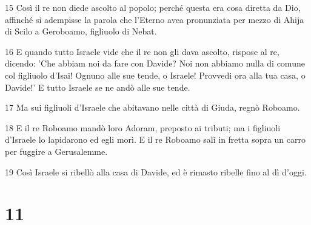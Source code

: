 \par 15 Così il re non diede ascolto al popolo; perché questa era cosa diretta da Dio, affinché si adempisse la parola che l'Eterno avea pronunziata per mezzo di Ahija di Scilo a Geroboamo, figliuolo di Nebat.
\par 16 E quando tutto Israele vide che il re non gli dava ascolto, rispose al re, dicendo: 'Che abbiam noi da fare con Davide? Noi non abbiamo nulla di comune col figliuolo d'Isai! Ognuno alle sue tende, o Israele! Provvedi ora alla tua casa, o Davide!' E tutto Israele se ne andò alle sue tende.
\par 17 Ma sui figliuoli d'Israele che abitavano nelle città di Giuda, regnò Roboamo.
\par 18 E il re Roboamo mandò loro Adoram, preposto ai tributi; ma i figliuoli d'Israele lo lapidarono ed egli morì. E il re Roboamo salì in fretta sopra un carro per fuggire a Gerusalemme.
\par 19 Così Israele si ribellò alla casa di Davide, ed è rimasto ribelle fino al dì d'oggi.

\chapter{11}

